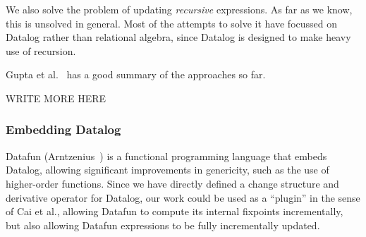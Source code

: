 We also solve the problem of updating \emph{recursive} expressions. As far as we
know, this is unsolved in general. Most of the attempts to solve it have
focussed on Datalog rather than relational algebra, since Datalog is designed to
make heavy use of recursion. 

Gupta et al.~\cite{gupta1995maintenance} has a good summary of the approaches so far.

WRITE MORE HERE

\subsubsection{Embedding Datalog}

Datafun (Arntzenius~\cite{arntz2016datafun}) is a functional programming language that embeds
Datalog, allowing significant improvements in genericity, such as the use of
higher-order functions. Since we have directly defined a change structure and
derivative operator for Datalog, our work could be used as a ``plugin'' in the sense
of Cai et al., allowing Datafun to compute its internal fixpoints
incrementally, but also allowing Datafun expressions to be fully incrementally updated.




